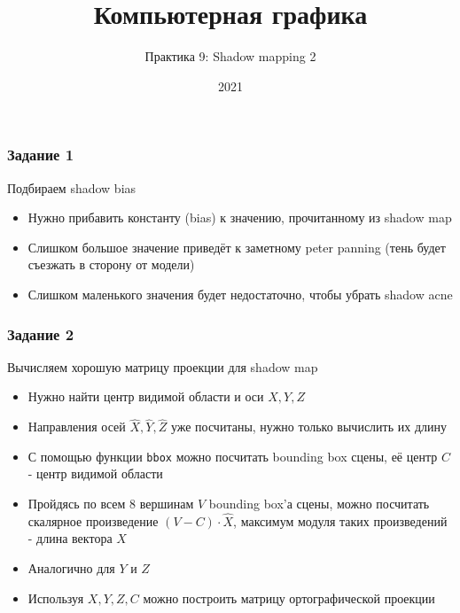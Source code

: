 \documentclass{beamer}
\title{Компьютерная графика}
\subtitle{Практика 9: Shadow mapping 2}
\date{2021}
\begin{document}
\frame{\titlepage}

\begin{frame}[fragile]
\frametitle{Задание 1}
Подбираем shadow bias
\begin{itemize}
\item Нужно прибавить константу (bias) к значению, прочитанному из shadow map
\pause
\item Слишком большое значение приведёт к заметному peter panning (тень будет съезжать в сторону от модели)
\pause
\item Слишком маленького значения будет недостаточно, чтобы убрать shadow acne
\end{itemize}
\end{frame}

\begin{frame}[fragile]
\frametitle{Задание 2}
Вычисляем хорошую матрицу проекции для shadow map
\begin{itemize}
\item Нужно найти центр видимой области и оси \begin{math}X, Y, Z\end{math}
\pause
\item Направления осей \begin{math}\hat X, \hat Y, \hat Z\end{math} уже посчитаны, нужно только вычислить их длину
\pause
\item С помощью функции \verb|bbox| можно посчитать bounding box сцены, её центр \begin{math}C\end{math} - центр видимой области
\pause
\item Пройдясь по всем 8 вершинам \begin{math}V\end{math} bounding box'а сцены, можно посчитать скалярное произведение \begin{math}(V - C) \cdot \hat X\end{math}, максимум модуля таких произведений - длина вектора \begin{math}X\end{math}
\pause
\item Аналогично для \begin{math}Y\end{math} и \begin{math}Z\end{math}
\pause
\item Используя \begin{math}X,Y,Z,C\end{math} можно построить матрицу ортографической проекции
\end{itemize}
\end{frame}
\end{document}
